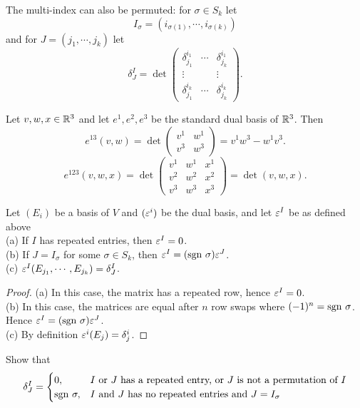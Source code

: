 The multi-index can also be permuted: for $\sigma \in S_k$ let 
$$I_\sigma = (i_{\sigma(1)},\cdots,i_{\sigma(k)})$$ and for $J = (j_1,\cdots, j_k)$ let 
$$\delta_J^I = \det  \begin{pmatrix}
\delta_{j_1}^{i_1} & \cdots & \delta_{j_k}^{i_1} \\
\vdots & & \vdots \\
\delta_{j_1}^{i_k} & \cdots & \delta_{j_k}^{i_k}
\end{pmatrix}.$$
\begin{example}
    Let $v,w,x \in \mathbb{R}^3$ and let $e^1,e^2,e^3$ be the standard dual basis of $\mathbb{R}^3$. Then 
    $$e^{13}(v,w) = \det \begin{pmatrix}
        v^1 & w^1 \\
        v^3 & w^3
    \end{pmatrix} = v^1 w^3 - w^1 v^3. $$
    $$e^{123}(v,w,x) = \det \begin{pmatrix}
        v^1 & w^1 & x^1 \\
        v^2 & w^2 & x^2 \\
        v^3 & w^3 & x^3 
    \end{pmatrix} = \det (v,w,x). $$
\end{example}
\begin{lemma}\label{14.7}
    Let $(E_i)$ be a basis of $V$ and $(\varepsilon^i)$ be the dual basis, and let $\varepsilon^I$ be as defined above \\
    (a) If $I$ has repeated entries, then $\varepsilon^I = 0$. \\
    (b) If $J = I_\sigma$ for some $\sigma \in S_k$, then $\varepsilon^I = (\mathrm{sgn~} \sigma) \varepsilon^J$. \\
    (c) $\varepsilon^I(E_{j_1},\cdots,E_{j_k}) = \delta_J^I$.
\end{lemma}
\begin{proof}
    (a) In this case, the matrix has a repeated row, hence $\varepsilon^I = 0$. \\
    (b) In this case, the matrices are equal after $n$ row swaps where $(-1)^n = \mathrm{sgn~} \sigma$. Hence $\varepsilon^I = (\mathrm{sgn~} \sigma) \varepsilon^J$. \\
    (c) By definition $\varepsilon^i(E_j) = \delta_j^i$.
\end{proof}
\begin{exercise}
Show that $$\delta_J^I = \begin{cases}
0, & I \text{ or } J \text{ has a repeated entry, or }J\text{ is not a permutation of }I \\
\mathrm{sgn~} \sigma, & I \text{ and } J \text{ has no repeated entries and }J=I_\sigma
\end{cases}$$
\end{exercise}
